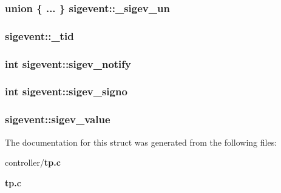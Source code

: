\subsubsection[{\_\-sigev\_\-un}]{\setlength{\rightskip}{0pt plus 5cm}union \{ ... \}   {\bf sigevent::\_\-sigev\_\-un}}\label{structsigevent_a591095c4e8420332e260414be1b01f92}
\subsubsection[{\_\-tid}]{ {\bf sigevent::\_\-tid}}\label{structsigevent_aae283fb8799fd184e639061a42416a78}
\subsubsection[{sigev\_\-notify}]{\setlength{\rightskip}{0pt plus 5cm}int {\bf sigevent::sigev\_\-notify}}\label{structsigevent_aae9a19d879c38e0c4e8a9bf738c5081e}
\subsubsection[{sigev\_\-signo}]{\setlength{\rightskip}{0pt plus 5cm}int {\bf sigevent::sigev\_\-signo}}\label{structsigevent_a5c645ec1d12bb46efc3f4097c52b665d}
\subsubsection[{sigev\_\-value}]{ {\bf sigevent::sigev\_\-value}}\label{structsigevent_aedd1f9ff34678d5cfb6946b4ca5a7521}


The documentation for this struct was generated from the following files:\begin{DoxyCompactItemize}
\item 
controller/{\bf tp.c}\item 
{\bf tp.c}\end{DoxyCompactItemize}
